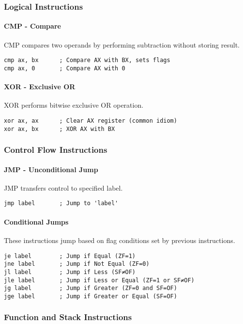 \documentclass[12pt,a4paper]{article}
\begin{document}
\subsubsection{Logical Instructions}

\paragraph{CMP - Compare}
CMP compares two operands by performing subtraction without storing result.
\begin{lstlisting}
cmp ax, bx      ; Compare AX with BX, sets flags
cmp ax, 0       ; Compare AX with 0
\end{lstlisting}

\paragraph{XOR - Exclusive OR}
XOR performs bitwise exclusive OR operation.
\begin{lstlisting}
xor ax, ax      ; Clear AX register (common idiom)
xor ax, bx      ; XOR AX with BX
\end{lstlisting}

\subsubsection{Control Flow Instructions}

\paragraph{JMP - Unconditional Jump}
JMP transfers control to specified label.
\begin{lstlisting}
jmp label       ; Jump to 'label'
\end{lstlisting}

\paragraph{Conditional Jumps}
These instructions jump based on flag conditions set by previous instructions.
\begin{lstlisting}
je label        ; Jump if Equal (ZF=1)
jne label       ; Jump if Not Equal (ZF=0)
jl label        ; Jump if Less (SF≠OF)
jle label       ; Jump if Less or Equal (ZF=1 or SF≠OF)
jg label        ; Jump if Greater (ZF=0 and SF=OF)
jge label       ; Jump if Greater or Equal (SF=OF)
\end{lstlisting}

\subsubsection{Function and Stack Instructions}
\end{document}
